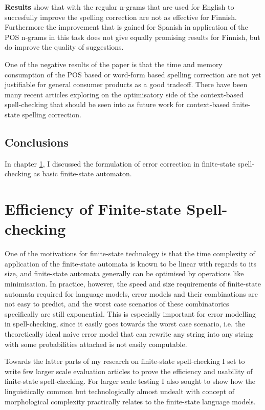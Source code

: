 \documentclass[officiallayout,draft]{unihelcompling}
\begin{document}
\textbf{Results} show that with the regular n-grams that are used for English
to succesfully improve the spelling correction are not as effective for 
Finnish. Furthermore the improvement that is gained for Spanish in application
of the POS n-grams in this task does not give equally promising results for
Finnish, but do improve the quality of suggestions.

One of the negative results of the paper is that the time and memory consumption
of the POS based or word-form based spelling correction are not yet
justifiable for general consumer products as a good tradeoff. There have been
many recent articles exploring on the optimisatory side of the context-based
spell-checking that should be seen into as future work for context-based
finite-state spelling correction.

\section{Conclusions}

In chapter \ref{}, I discussed the formulation of error correction in 
finite-state spell-checking as basic finite-state automaton. 

\chapter{Efficiency of Finite-state Spell-checking}
\label{chap:efficiency}

One of the motivations for finite-state technology is that the time complexity
of application of the finite-state automata is known to be linear with regards
to its size, and finite-state automata generally can be optimised by operations
like minimisation. In practice, however, the speed and size requirements of
finite-state automata required for language models, error models and their
combinations are not easy to predict, and the worst case scenarios of these
combinatorics specifically are still exponential. This is especially important
for error modelling in spell-checking, since it easily goes towards the worst
case scenario, i.e. the theoretically ideal naive error model that can rewrite
any string into any string with some probabilities attached is not easily
computable.

Towards the latter parts of my research on finite-state spell-checking I set to
write few larger scale evaluation articles to prove the efficiency and
usability of finite-state spell-checking. For larger scale testing I also
sought to show how the linguistically common but technologically almost
undealt with concept of morphological complexity practically relates to the
finite-state language models.
\end{document}
